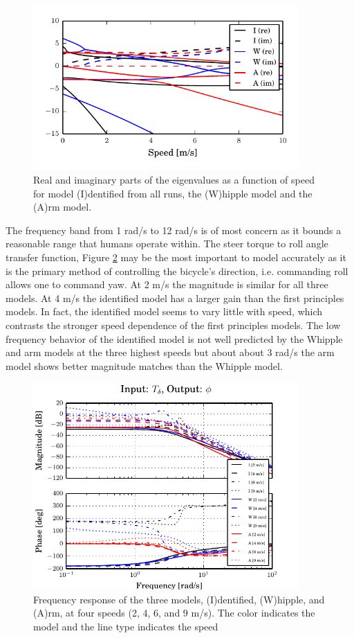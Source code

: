 \documentclass[a4paper]{article}
\begin{document}
\begin{figure}
  \centering
  \includegraphics[width=4in]{figures/L-P-eig.pdf}
  \caption{Real and imaginary parts of the eigenvalues as a function of speed
    for model (I)dentified from all runs, the (W)hipple model and the (A)rm
    model.}
  \label{fig:L-P-eig}
\end{figure}

The frequency band from 1 rad/s to 12 rad/s is of most concern as it bounds a
reasonable range that humans operate within. The steer torque to roll angle
transfer function, Figure \ref{fig:L-P-Tdel-Phi} may be the most important to
model accurately as it is the primary method of controlling the bicycle's
direction, i.e. commanding roll allows one to command yaw. At 2 m/s the
magnitude is similar for all three models. At 4 m/s the identified model has a
larger gain than the first principles models. In fact, the identified model
seems to vary little with speed, which contrasts the stronger speed dependence
of the first principles models. The low frequency behavior of the identified
model is not well predicted by the Whipple and arm models at the three highest
speeds but about about 3 rad/s the arm model shows better magnitude matches
than the Whipple model.

\begin{figure}
  \centering
  \includegraphics[width=4in]{figures/L-P-Tdel-Phi.pdf}
  \caption{Frequency response of the three models, (I)dentified, (W)hipple, and
    (A)rm, at four speeds (2, 4, 6, and 9 m/s). The color indicates the model
    and the line type indicates the speed}
  \label{fig:L-P-Tdel-Phi}
\end{figure}
\end{document}
